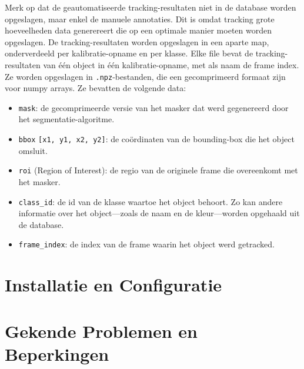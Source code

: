 Merk op dat de geautomatiseerde tracking-resultaten niet in de database worden opgeslagen, maar enkel de manuele annotaties.
Dit is omdat tracking grote hoeveelheden data generereert die op een optimale manier moeten worden opgeslagen.
De tracking-resultaten worden opgeslagen in een aparte map, onderverdeeld per kalibratie-opname en per klasse.
Elke file bevat de tracking-resultaten van één object in één kalibratie-opname, met als naam de frame index.
Ze worden opgeslagen in \texttt{.npz}-bestanden, die een gecomprimeerd formaat zijn voor numpy arrays.
Ze bevatten de volgende data:
\begin{itemize}
  \item \texttt{mask}: de gecomprimeerde versie van het masker dat werd gegenereerd door het segmentatie-algoritme.
  \item \texttt{bbox} \texttt{[x1, y1, x2, y2]}: de coördinaten van de bounding-box die het object omsluit.
  \item \texttt{roi} (Region of Interest): de regio van de originele frame die overeenkomt met het masker.
  \item \texttt{class\_id}: de id van de klasse waartoe het object behoort. 
  Zo kan andere informatie over het object---zoals de naam en de kleur---worden opgehaald uit de database.
  \item \texttt{frame\_index}: de index van de frame waarin het object werd getracked.
\end{itemize}

\section{Installatie en Configuratie}


\section{Gekende Problemen en Beperkingen}

